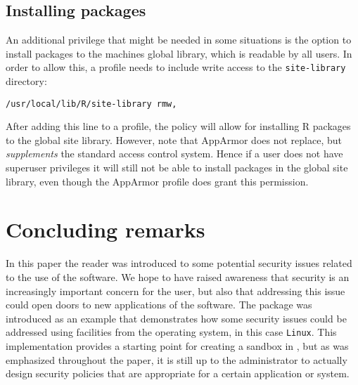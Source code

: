 \documentclass[article]{jss}
\begin{document}
\subsection{Installing packages}

An additional privilege that might be needed in some situations is the option to
install packages to the machines global library, which is readable by all users.
In order to allow this, a profile needs to include write access to the
\texttt{site-library} directory:

\begin{verbatim}
/usr/local/lib/R/site-library rmw,
\end{verbatim}

After adding this line to a profile, the policy will allow for installing R
packages to the global site library. However, note that AppArmor does not
replace, but \emph{supplements} the standard access control system. Hence if a
user does not have superuser privileges it will still not be able to install
packages in the global site library, even though the AppArmor profile does grant
this permission.

\newpage
\section{Concluding remarks}

In this paper the reader was introduced to some potential security issues
related to the use of the  software. We hope to have raised 
awareness that security is an increasingly important concern for the
 user, but also that addressing this issue could open doors to new
applications of the software. The  package was introduced as an
example that demonstrates how some security issues could be addressed using
facilities from the operating system, in this case \texttt{Linux}. This
implementation provides a starting point for creating a sandbox in ,
but as was emphasized throughout the paper, it is still up to the administrator
to actually design security policies that are appropriate for a certain
application or system.
\end{document}
